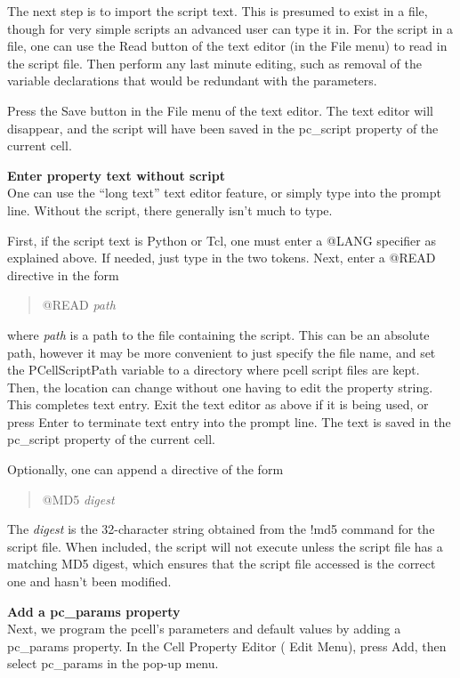 \begin{description}
The next step is to import the script text.  This is presumed to exist
in a file, though for very simple scripts an advanced user can type it
in.  For the script in a file, one can use the {\cb Read} button of
the text editor (in the {\cb File} menu) to read in the script file. 
Then perform any last minute editing, such as removal of the variable
declarations that would be redundant with the parameters.

Press the {\cb Save} button in the {\cb File} menu of the text editor. 
The text editor will disappear, and the script will have been saved in
the {\et pc\_script} property of the current cell.

\item{\bf Enter property text without script}\\
One can use the ``long text'' text editor feature, or simply type into
the prompt line.  Without the script, there generally isn't much to
type.

First, if the script text is Python or Tcl, one must enter a {\vt
@LANG} specifier as explained above.  If needed, just type in the two
tokens.  Next, enter a {\vt @READ} directive in the form
\begin{quote}
{\vt @READ} {\it path}
\end{quote}
where {\it path} is a path to the file containing the script.  This
can be an absolute path, however it may be more convenient to just
specify the file name, and set the {\et PCellScriptPath} variable to a
directory where pcell script files are kept.  Then, the location can
change without one having to edit the property string.  This completes
text entry.  Exit the text editor as above if it is being used, or
press {\kb Enter} to terminate text entry into the prompt line.  The
text is saved in the {\et pc\_script} property of the current cell.

Optionally, one can append a directive of the form
\begin{quote}
{\vt @MD5} {\it digest}
\end{quote}
The {\it digest} is the 32-character string obtained from the {\cb
!md5} command for the script file.  When included, the script will not
execute unless the script file has a matching MD5 digest, which
ensures that the script file accessed is the correct one and hasn't
been modified.

\item{\bf Add a {\et pc\_params} property}\\
Next, we program the pcell's parameters and default values by adding a
{\et pc\_params} property.  In the {\cb Cell Property Editor} ({\cb
Edit Menu}), press {\cb Add}, then select {\cb pc\_params} in the
pop-up menu.


\end{description}
